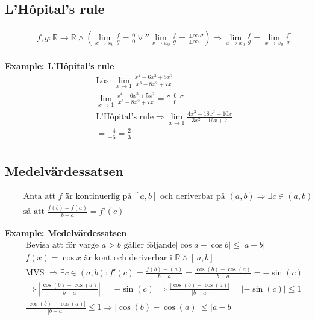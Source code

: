 \newpage

\subsection{L'Hôpital's rule} 
\begin{align*}
  &\quad  f,g:\mathbb{R}\to\mathbb{R} \land \left( \lim_{x \to x_0}\frac{f}{g}
  =\frac{0}{0}\lor ''{\lim_{x\to x_0}\frac{f}{g}=\frac{\pm \infty}{\pm \infty}}'' \right)
  \Rightarrow \lim_{x \to x_0}\frac{f}{g}=\lim_{x \to x_0}\frac{f'}{g'} \\ 
\end{align*}

\textbf{Example: L'Hôpital's rule}
\begin{align*}
  &\quad  \text{Lös: } \lim_{x \to 1}\frac{x^4-6x^3+5x^2}{x^3-8x^2+7x}\\
  &\quad  \lim_{x \to 1}\frac{x^4-6x^3+5x^2}{x^3-8x^2+7x} = '' \; \frac{0}{0} \; '' \\
  &\quad  \text{L'Hôpital's rule} \Rightarrow \lim_{x \to 1}\frac{4x^3-18x^2+10x}{3x^2-16x+7} \\
  &\quad  = \frac{-4}{-6} = \frac{2}{3} \\
\end{align*}


\subsection{Medelvärdessatsen} 
\begin{align*}
  &\quad  \text{Anta att $f$ är kontinuerlig på $[a,b]$ och deriverbar på $(a,b)$}
  \Rightarrow \exists c \in (a,b) \\
  &\quad  \text{så att } \frac{f(b)-f(a)}{b-a}= f'(c)
\end{align*}

\textbf{Example: Medelvärdessatsen}
\begin{align*}
  &\quad  \text{Bevisa att för varge $a>b$ gäller följande} |\cos{a}-\cos{b}| \leq |a-b| \\
  &\quad  f(x)=\cos{x} \text{ är kont och deriverbar i } \mathbb{R} \land [ \, a,b ] \, \\
  &\quad  \text{MVS }\Rightarrow \exists c \in (a,b):f'(c)=\frac{f(b)-(a)}{b-a}=
  \frac{\cos(b)-\cos(a)}{b-a}=-\sin(c) \\
  &\quad  \Rightarrow |\frac{\cos(b)-\cos(a)}{b-a}|=|-\sin(c)| \Rightarrow
  \frac{|\cos(b)-\cos(a)|}{|b-a|}=|-\sin(c)| \leq 1 \\
  &\quad  \frac{|\cos(b)-\cos(a)|}{|b-a|} \leq 1 \Rightarrow |\cos(b)-\cos(a)| \leq |a-b|
\end{align*}


